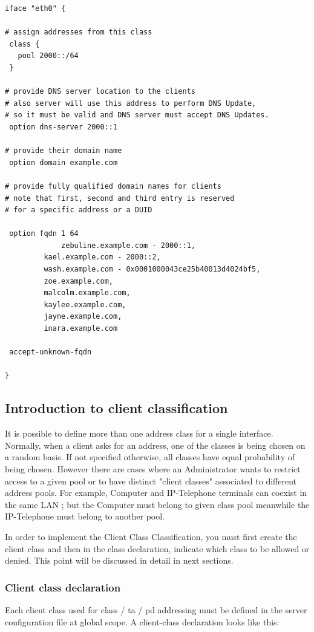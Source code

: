 \begin{lstlisting}
iface "eth0" {

# assign addresses from this class
 class {
   pool 2000::/64
 }

# provide DNS server location to the clients
# also server will use this address to perform DNS Update,
# so it must be valid and DNS server must accept DNS Updates.
 option dns-server 2000::1
 
# provide their domain name
 option domain example.com

# provide fully qualified domain names for clients
# note that first, second and third entry is reserved
# for a specific address or a DUID

 option fqdn 1 64
             zebuline.example.com - 2000::1,
	     kael.example.com - 2000::2,
	     wash.example.com - 0x0001000043ce25b40013d4024bf5,
	     zoe.example.com,
	     malcolm.example.com,
	     kaylee.example.com,
	     jayne.example.com,
	     inara.example.com

 accept-unknown-fqdn
	     
}
\end{lstlisting}

\subsection{Introduction to client classification}
It is possible to define more than one address class for a single
interface. Normally, when a client asks for an address, one of the
classes is being chosen on a random basis. If not specified otherwise,
all classes have equal probability of being chosen. However there are
cases where an Administrator wants to restrict access to a given pool
or to have distinct "client classes" associated to different address
pools. For example, Computer and IP-Telephone terminals can coexist in
the same LAN ; but the Computer must belong to given class pool
meanwhile the IP-Telephone must belong to another pool.

In order to implement the Client Class Classification, you must first
create the client class and then in the class declaration, indicate
which class to be allowed or denied. This point will be discussed in
detail in next sections.

\subsubsection{Client class  declaration}
Each client class used for class / ta / pd addressing must be defined
in the server configuration file at global scope. A client-class
declaration looks like this:

